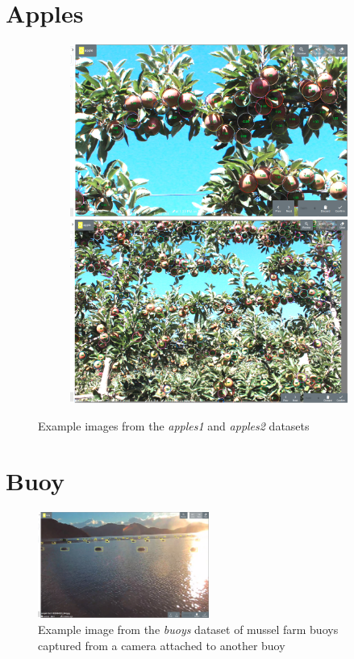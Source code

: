 \section{Apples}


\begin{figure}[h!]

\begin{subfigure}[t]{1.0\linewidth}
  \includegraphics[width=0.475\linewidth]{figures/annotation/screenshots/apples_big.png}
  \hfill
  \includegraphics[width=0.475\linewidth]{figures/annotation/screenshots/apples_small.png}
\end{subfigure}
\caption{Example images from the \emph{apples1} and \emph{apples2} datasets}
\label{fig:apples_dataset}  
\end{figure}


\section{Buoy}

\begin{figure}[h]
  \includegraphics[width=0.5\textwidth]{figures/annotation/screenshots/buoys.png}
  \caption{Example image from the \emph{buoys} dataset of mussel farm buoys captured from a camera attached to another buoy }
  \label{fig:buoys_dataset}
\end{figure}

